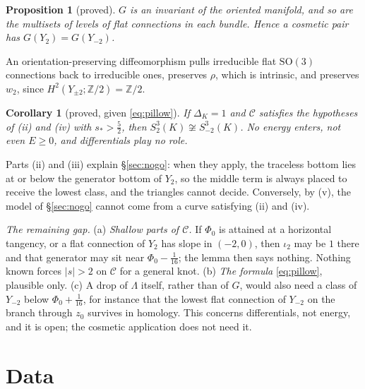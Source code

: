 \documentclass[10pt]{amsart}
\makeatletter
\numberwithin{equation}{section}
\theoremstyle{compact}
\newtheorem{proposition}[theorem]{Proposition}
\newtheorem{corollary}[theorem]{Corollary}
\theoremstyle{definition}
\renewenvironment{proof}[1][\proofname]{\par\pushQED{\qed}\normalfont
  \topsep4\p@\relax\trivlist\item[\hskip\labelsep\itshape#1\@addpunct{.}]%
  \ignorespaces}{\popQED\endtrivlist\@endpefalse}
\newcommand{\Z}{\mathbb Z}
\newcommand{\SO}{\mathrm{SO}}
\newcommand{\cC}{\mathcal C}
\newcommand{\st}[1]{\par\noindent\textit{#1}\enspace}
\makeatother
\begin{document}
\begin{proposition}[proved]\label{prop:invariant}
$G$ is an invariant of the oriented manifold, and so are the multisets of
levels of flat connections in each bundle. Hence a cosmetic pair has
$G(Y_2)=G(Y_{-2})$.
\end{proposition}

\begin{proof}
An orientation-preserving diffeomorphism pulls irreducible flat $\SO(3)$
connections back to irreducible ones, preserves $\rho$, which is intrinsic,
and preserves $w_2$, since $H^2(Y_{\pm2};\Z/2)=\Z/2$.
\end{proof}

\begin{corollary}[proved, given \eqref{eq:pillow}]
If $\Delta_K=1$ and $\cC$ satisfies the hypotheses of (ii) and (iv) with
$s_*>\frac52$, then $S^3_2(K)\not\cong S^3_{-2}(K)$. No energy enters, not
even $E\ge0$, and differentials play no role.
\end{corollary}

Parts (ii) and (iii) explain \S\ref{sec:nogo}: when they apply, the
traceless bottom lies at or below the generator bottom of $Y_2$, so the
middle term is always placed to receive the lowest class, and the triangles
cannot decide. Conversely, by (v), the model of \S\ref{sec:nogo} cannot come
from a curve satisfying (ii) and (iv).

\st{The remaining gap.} (a) \emph{Shallow parts of $\cC$.} If $\Phi_0$ is
attained at a horizontal tangency, or a flat connection of $Y_2$ has slope
in $(-2,0)$, then $\iota_2$ may be $1$ there and that generator may sit near
$\Phi_0-\frac1{16}$; the lemma then says nothing. Nothing known forces
$|s|>2$ on $\cC$ for a general knot. (b) \emph{The formula}
\eqref{eq:pillow}, plausible only. (c) A drop of $\Lambda$ itself, rather
than of $G$, would also need a class of $Y_{-2}$ below $\Phi_0+\frac1{16}$,
for instance that the lowest flat connection of $Y_{-2}$ on the branch
through $z_0$ survives in homology. This concerns differentials, not
energy, and it is open; the cosmetic application does not need it.

\section{Data}\label{sec:data}
\end{document}
